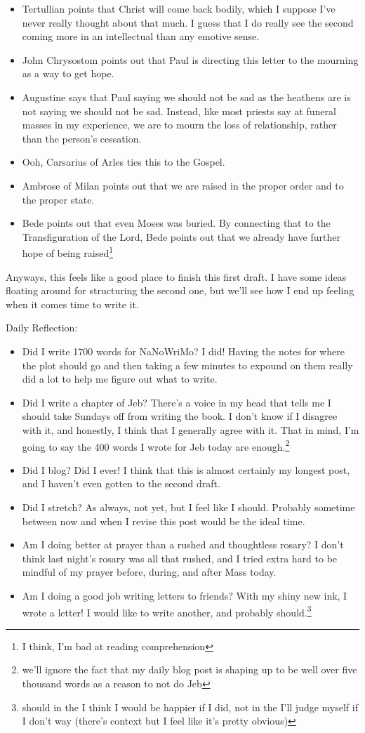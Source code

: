 \documentclass[12pt]{article}[titlepage]
\newcommand{\1}{\={a}}
\newcommand{\2}{\={e}}
\newcommand{\3}{\={\i}}
\newcommand{\4}{\=o}
\newcommand{\5}{\=u}
\newcommand{\6}{\={A}}
\renewcommand{\,}{\textsuperscript{,}}
\begin{document}
\begin{itemize}
\item Tertullian points that Christ will come back bodily, which I suppose I've never really thought about that much.
I guess that I do really see the second coming more in an intellectual than any emotive sense.
\item John Chrysostom points out that Paul is directing this letter to the mourning as a way to get hope.
\item Augustine says that Paul saying we should not be sad as the heathens are is not saying we should not be sad.
Instead, like most priests say at funeral masses in my experience, we are to mourn the loss of relationship, rather than the person's cessation.
\item Ooh, Carsarius of Arles ties this to the Gospel.
\item Ambrose of Milan points out that we are raised in the proper order and to the proper state.
\item Bede points out that even Moses was buried. By connecting that to the Transfiguration of the Lord, Bede points out that we already have further hope of being raised\footnote{I think, I'm bad at reading comprehension}
\end{itemize}

Anyways, this feels like a good place to finish this first draft.
I have some ideas floating around for structuring the second one, but we'll see how I end up feeling when it comes time to write it.

Daily Reflection:
\begin{itemize}
\item Did I write 1700 words for NaNoWriMo?
I did! Having the notes for where the plot should go and then taking a few minutes to expound on them really did a lot to help me figure out what to write.
\item Did I write a chapter of Jeb?
There's a voice in my head that tells me I should take Sundays off from writing the book.
I don't know if I disagree with it, and honestly, I think that I generally agree with it.
That in mind, I'm going to say the 400 words I wrote for Jeb today are enough.\footnote{we'll ignore the fact that my daily blog post is shaping up to be well over five thousand words as a reason to not do Jeb}
\item Did I blog? Did I ever! I think that this is almost certainly my longest post, and I haven't even gotten to the second draft.
\item Did I stretch? As always, not yet, but I feel like I should.
Probably sometime between now and when I revise this post would be the ideal time.
\item Am I doing better at prayer than a rushed and thoughtless rosary? I don't think last night's rosary was all that rushed, and I tried extra hard to be mindful of my prayer before, during, and after Mass today.
\item Am I doing a good job writing letters to friends?
With my shiny new ink, I wrote a letter! I would like to write another, and probably should.\footnote{should in the I think I would be happier if I did, not in the I'll judge myself if I don't way (there's context but I feel like it's pretty obvious)}
\end{itemize}
\end{document}
